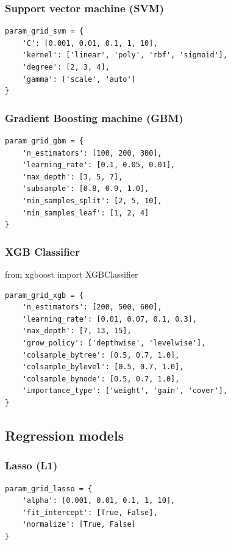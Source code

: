 \documentclass[24pt]{article}
\begin{document}
\subsubsection{Support vector machine (SVM)}

\begin{lstlisting}
param_grid_svm = {
    'C': [0.001, 0.01, 0.1, 1, 10],
    'kernel': ['linear', 'poly', 'rbf', 'sigmoid'],
    'degree': [2, 3, 4], 
    'gamma': ['scale', 'auto']
}
\end{lstlisting}

\subsubsection{Gradient Boosting machine (GBM)}

\begin{lstlisting}
param_grid_gbm = {
    'n_estimators': [100, 200, 300],
    'learning_rate': [0.1, 0.05, 0.01],
    'max_depth': [3, 5, 7],
    'subsample': [0.8, 0.9, 1.0],
    'min_samples_split': [2, 5, 10],
    'min_samples_leaf': [1, 2, 4]
}
\end{lstlisting}

\subsubsection{XGB Classifier}
from xgboost import XGBClassifier
\begin{lstlisting}
param_grid_xgb = {
    'n_estimators': [200, 500, 600],
    'learning_rate': [0.01, 0.07, 0.1, 0.3],
    'max_depth': [7, 13, 15],
    'grow_policy': ['depthwise', 'levelwise'],
    'colsample_bytree': [0.5, 0.7, 1.0],
    'colsample_bylevel': [0.5, 0.7, 1.0],
    'colsample_bynode': [0.5, 0.7, 1.0],
    'importance_type': ['weight', 'gain', 'cover'],
}
\end{lstlisting}


\subsection{Regression models}


\subsubsection{Lasso (L1)}
\begin{lstlisting}
param_grid_lasso = {
    'alpha': [0.001, 0.01, 0.1, 1, 10],
    'fit_intercept': [True, False],
    'normalize': [True, False]
}
\end{lstlisting}
\end{document}
